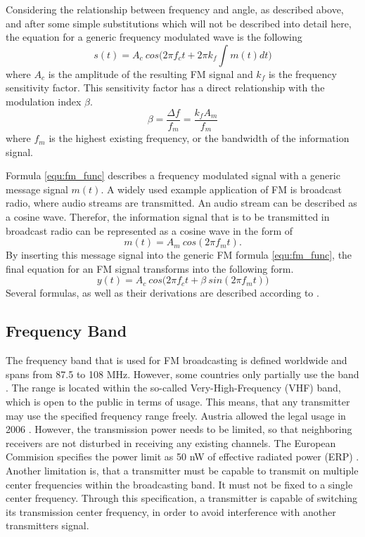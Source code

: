Considering the relationship between frequency and angle, as described above, and after some simple substitutions which will not be described into detail here, the equation for a generic frequency modulated wave is the following
\begin{equation}
  s(t) = A_c\ cos \Big( 2 \pi f_c t + 2 \pi k_f \int m(t) dt \Big)
  \label{equ:fm_func}
\end{equation}
where $A_c$ is the amplitude of the resulting FM signal and $k_f$ is the frequency sensitivity factor.
This sensitivity factor has a direct relationship with the modulation index $\beta$.
\begin{equation}
  \beta = \frac{\Delta f}{f_m} = \frac{k_f A_m}{f_m}
\end{equation}
where $f_m$ is the highest existing frequency, or the bandwidth of the information signal.

Formula \ref{equ:fm_func} describes a frequency modulated signal with a generic message signal $m(t)$.
A widely used example application of FM is broadcast radio, where audio streams are transmitted.
An audio stream can be described as a cosine wave.
Therefor, the information signal that is to be transmitted in broadcast radio can be represented as a cosine wave in the form of
\begin{equation}
  m(t) = A_m\ cos(2 \pi f_m t).
\end{equation}
By inserting this message signal into the generic FM formula \ref{equ:fm_func}, the final equation for an FM signal transforms into the following form.
\begin{equation}
  y(t) = A_c\ cos \Big(2 \pi f_c t + \beta\ sin(2 \pi f_m t)\Big )
\end{equation}
Several formulas, as well as their derivations are described according to \cite{ref_FM_Maths_Info_1}\cite{ref_FMMaths2}.

\subsection{Frequency Band}

The frequency band that is used for FM broadcasting is defined worldwide and spans from 87.5 to 108 MHz.
However, some countries only partially use the band \cite{ref_itu_regulations}.
The range is located within the so-called Very-High-Frequency (VHF) band, which is open to the public in terms of usage.
This means, that any transmitter may use the specified frequency range freely.
Austria allowed the legal usage in 2006 \cite{ref_austria_rundfunkgesetz_2006}.
However, the transmission power needs to be limited, so that neighboring receivers are not disturbed in receiving any existing channels.
The European Commision specifies the power limit as 50 nW of effective radiated power (ERP) \cite{ref_eu_commision_radio_spectrum}.
Another limitation is, that a transmitter must be capable to transmit on multiple center frequencies within the broadcasting band.
It must not be fixed to a single center frequency.
Through this specification, a transmitter is capable of switching its transmission center frequency, in order to avoid interference with another transmitters signal.

